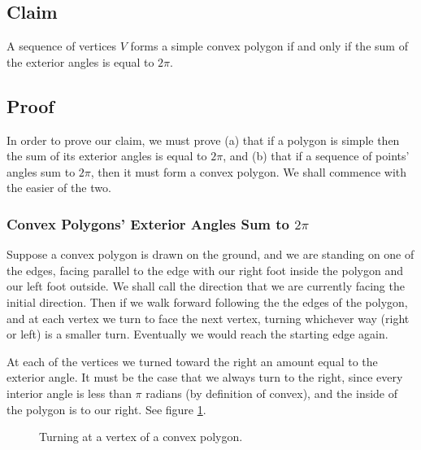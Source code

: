 \documentclass{article}
\begin{document}
\subsection{Claim}

A sequence of vertices \(V\) forms a simple convex polygon if and only if the sum of the exterior angles is equal to \(2\pi\).

\subsection{Proof}

In order to prove our claim, we must prove (a) that if a polygon is simple then the sum of its exterior angles is equal to \(2\pi\), and (b) that if a sequence of points' angles sum to \(2\pi\), then it must form a convex polygon. We shall commence with the easier of the two.

\subsubsection{Convex Polygons' Exterior Angles Sum to \(2\pi\)}

Suppose a convex polygon is drawn on the ground, and we are standing on one of the edges, facing parallel to the edge with our right foot inside the polygon and our left foot outside. We shall call the direction that we are currently facing the initial direction. Then if we walk forward following the the edges of the polygon, and at each vertex we turn to face the next vertex, turning whichever way (right or left) is a smaller turn. Eventually we would reach the starting edge again.

At each of the vertices we turned toward the right an amount equal to the exterior angle. It must be the case that we always turn to the right, since every interior angle is less than \(\pi\) radians (by definition of convex), and the inside of the polygon is to our right. See figure \ref{walk-1}.

\begin{figure}[htbp]
	\centering
	\caption{Turning at a vertex of a convex polygon.}
	\label{walk-1}
\end{figure}
\end{document}
